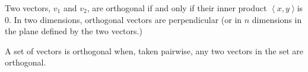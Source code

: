 \documentclass[12pt]{article}
\begin{document}
Two vectors, $v_1$ and $v_2$, are orthogonal if and only if their inner product $\left<x,y\right>$is 0.  In two dimensions, orthogonal vectors are perpendicular (or in $n$ dimensions in the plane defined by the two vectors.)

A set of vectors is orthogonal when, taken pairwise, any two vectors in the set are orthogonal.
\end{document}
